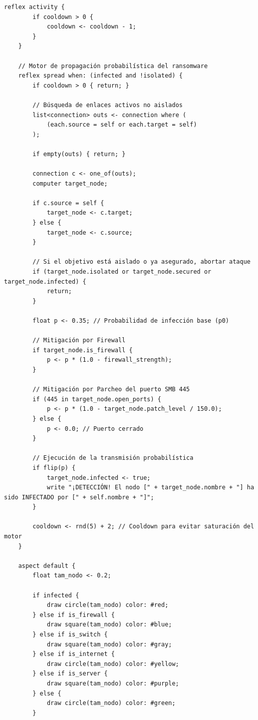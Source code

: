 \documentclass{ieeeaccess}
\begin{document}
\begin{lstlisting}[caption={InfeccionRedes.gaml - Código fuente de la simulación en GAMA Platform}, label={list:gaml_code}]
    reflex activity {
        if cooldown > 0 {
            cooldown <- cooldown - 1;
        }
    }
    
    // Motor de propagación probabilística del ransomware
    reflex spread when: (infected and !isolated) {
        if cooldown > 0 { return; }
        
        // Búsqueda de enlaces activos no aislados
        list<connection> outs <- connection where (
            (each.source = self or each.target = self)
        );
        
        if empty(outs) { return; }
        
        connection c <- one_of(outs);
        computer target_node;
        
        if c.source = self {
            target_node <- c.target;
        } else {
            target_node <- c.source;
        }
        
        // Si el objetivo está aislado o ya asegurado, abortar ataque
        if (target_node.isolated or target_node.secured or target_node.infected) {
            return;
        }
        
        float p <- 0.35; // Probabilidad de infección base (p0)
        
        // Mitigación por Firewall
        if target_node.is_firewall {
            p <- p * (1.0 - firewall_strength);
        }
        
        // Mitigación por Parcheo del puerto SMB 445
        if (445 in target_node.open_ports) {
            p <- p * (1.0 - target_node.patch_level / 150.0);
        } else {
            p <- 0.0; // Puerto cerrado
        }
        
        // Ejecución de la transmisión probabilística
        if flip(p) {
            target_node.infected <- true;
            write "¡DETECCIÓN! El nodo [" + target_node.nombre + "] ha sido INFECTADO por [" + self.nombre + "]";
        }
        
        cooldown <- rnd(5) + 2; // Cooldown para evitar saturación del motor
    }
    
    aspect default {
        float tam_nodo <- 0.2;
        
        if infected {
            draw circle(tam_nodo) color: #red;
        } else if is_firewall {
            draw square(tam_nodo) color: #blue;
        } else if is_switch {
            draw square(tam_nodo) color: #gray;
        } else if is_internet {
            draw circle(tam_nodo) color: #yellow;
        } else if is_server {
            draw square(tam_nodo) color: #purple;
        } else {
            draw circle(tam_nodo) color: #green;
        }
        

\end{lstlisting}
\end{document}
